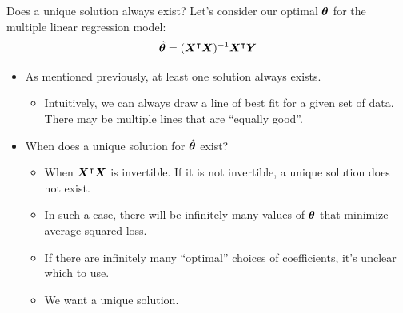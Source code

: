 \documentclass[aspectratio=169]{../latex_main/tntbeamer}  %
\begin{document}
	
	\begin{frame}{Does a unique solution always exist?}
	   Let’s consider our optimal $\bm{\theta}$ for the multiple linear regression model:
	   \begin{equation*}
	       \hat{\bm{\theta}} = (\bm{X}^\intercal\bm{X})^{-1} \bm{X}^\intercal\bm{Y}
	   \end{equation*}
	    
	    \begin{itemize}
	        \item As mentioned previously, at least one solution always exists.
	        \begin{itemize}
	            \item Intuitively, we can always draw a line of best fit for a given set of data. There may be multiple lines that are “equally good”.
	        \end{itemize}
	        \item When does a unique solution for   $\hat{\bm{\theta}}$  exist?
            \begin{itemize}
                \item When     $\bm{X}^\intercal\bm{X}$      is invertible. If it is not invertible, a unique solution does not exist.
                \item In such a case, there will be infinitely many values of $\bm{\theta}$ that minimize average squared loss.
                \item If there are infinitely many “optimal” choices of coefficients, it’s unclear which to use.
                \item We want a unique solution.
            \end{itemize}
	    \end{itemize}

	\end{frame}
	
\end{document}
